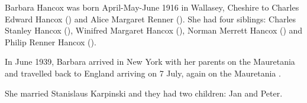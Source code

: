 
Barbara Hancox was born April-May-June 1916 in Wallasey, Cheshire to Charles Edward Hancox () and Alice Margaret Renner ()\cite{BarbaraHancoxBirth}.  She had four siblings: Charles Stanley Hancox (), Winifred Margaret Hancox (), Norman Merrett Hancox () and Philip Renner Hancox ().

In June 1939, Barbara arrived in New York with her parents on the Mauretania  and travelled back to England arriving on 7 July, again on the Mauretania \cite{BarbaraHancoxTravel}.

She married Stanislaus Karpinski and they had two children: Jan and Peter.
